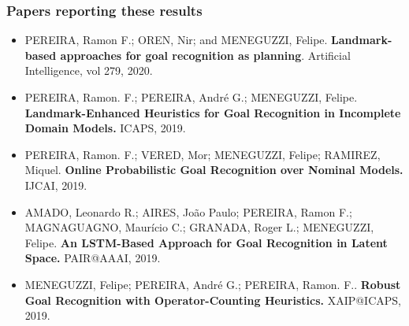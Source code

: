 \documentclass[usenames,dvipsnames]{beamer}
\begin{document}
\begin{frame}[c, allowframebreaks]\frametitle{Papers reporting these results}
	\footnotesize
	\begin{itemize}
	\item[] PEREIRA, Ramon F.; OREN, Nir; and MENEGUZZI, Felipe. \textbf{Landmark-based approaches for goal recognition as planning}. Artificial Intelligence, vol 279, 2020. 
	\item[] PEREIRA, Ramon. F.; PEREIRA, André G.; MENEGUZZI, Felipe. \textbf{Landmark-Enhanced Heuristics for Goal Recognition in Incomplete Domain Models.} ICAPS, 2019. 
	\item[] PEREIRA, Ramon. F.; VERED, Mor; MENEGUZZI, Felipe; RAMIREZ, Miquel. \textbf{Online Probabilistic Goal Recognition over Nominal Models.} IJCAI, 2019. 
	\item[] AMADO, Leonardo R.; AIRES, João Paulo; PEREIRA, Ramon F.; MAGNAGUAGNO, Maurício C.; GRANADA, Roger L.; MENEGUZZI, Felipe. \textbf{An LSTM-Based Approach for Goal Recognition in Latent Space.} PAIR@AAAI, 2019. 
	\item[] MENEGUZZI, Felipe; PEREIRA, André G.; PEREIRA, Ramon. F.. \textbf{Robust Goal Recognition with Operator-Counting Heuristics.} XAIP@ICAPS, 2019.  
	
	\framebreak
	

\end{itemize}
\end{frame}
\end{document}
